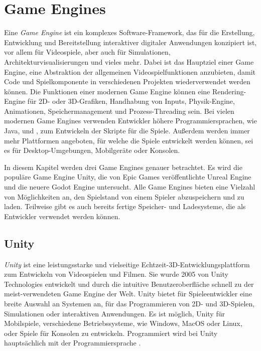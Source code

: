 \chapter{Game Engines}\label{ch:gameengines}
Eine \textit{Game Engine} ist ein komplexes Software-Framework, das für die Erstellung, Entwicklung und Bereitstellung interaktiver digitaler Anwendungen konzipiert ist, vor allem für Videospiele, aber auch für Simulationen, Architekturvisualisierungen und vieles mehr. Dabei ist das Hauptziel einer Game Engine, eine Abstraktion der allgemeinen Videospielfunktionen anzubieten, damit Code und Spielkomponente in verschiedenen Projekten wiederverwendet werden können. Die Funktionen einer modernen Game Engine können eine Rendering-Engine für 2D- oder 3D-Grafiken, Handhabung von Inputs, Physik-Engine, Animationen, Speichermanagement und Prozess-Threading sein. Bei vielen modernen Game Engines verwenden Entwickler höhere Programmiersprachen, wie Java, \cpp{} und \csharp{}, zum Entwickeln der Skripte für die Spiele.\cite{appacademyBestProgramming} Außerdem werden immer mehr Plattformen angeboten, für welche die Spiele entwickelt werden können, sei es für Desktop-Umgebungen, Mobilgeräte oder Konsolen.\cite{andrade2015game}

In diesem Kapitel werden drei Game Engines genauer betrachtet. Es wird die populäre Game Engine Unity\cite{vsmid2017comparison}, die von Epic Games veröffentlichte Unreal Engine und die neuere Godot Engine untersucht. Alle Game Engines bieten eine Vielzahl von Möglichkeiten an, den Spielstand von einem Spieler abzuspeichern und zu laden. Teilweise gibt es auch bereits fertige Speicher- und Ladesysteme, die als Entwickler verwendet werden können.



\section{Unity}
\textit{Unity} ist eine leistungsstarke und vielseitige Echtzeit-3D-Entwicklungsplattform zum Entwickeln von Videospielen und Filmen. Sie wurde 2005 von Unity Technologies entwickelt und durch die intuitive Benutzeroberfläche schnell zu der meist-verwendeten Game Engine der Welt. Unity bietet für Spieleentwickler eine breite Auswahl an Systemen an, für das Programmieren von 2D- und 3D-Spielen, Simulationen oder interaktiven Anwendungen. Es ist möglich, Unity für Mobilspiele, verschiedene Betriebssysteme, wie Windows, MacOS oder Linux, oder Spiele für Konsolen zu entwickeln. Programmiert wird bei Unity hauptsächlich mit der Programmiersprache \csharp{}.\cite{unityUnityEngine}\cite{vsmid2017comparison}


